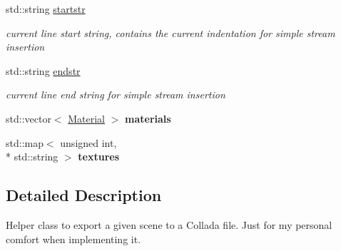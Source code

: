 \begin{DoxyCompactItemize}
\item 
\hypertarget{class_assimp_1_1_collada_exporter_aa000555b4aab13b953e4a07e65f98c30}{std\+::string \hyperlink{class_assimp_1_1_collada_exporter_aa000555b4aab13b953e4a07e65f98c30}{startstr}}\label{class_assimp_1_1_collada_exporter_aa000555b4aab13b953e4a07e65f98c30}

\begin{DoxyCompactList}\small\item\em current line start string, contains the current indentation for simple stream insertion \end{DoxyCompactList}\item 
\hypertarget{class_assimp_1_1_collada_exporter_a744b568aab4fbde6c09e85582e6105ea}{std\+::string \hyperlink{class_assimp_1_1_collada_exporter_a744b568aab4fbde6c09e85582e6105ea}{endstr}}\label{class_assimp_1_1_collada_exporter_a744b568aab4fbde6c09e85582e6105ea}

\begin{DoxyCompactList}\small\item\em current line end string for simple stream insertion \end{DoxyCompactList}\item 
\hypertarget{class_assimp_1_1_collada_exporter_abcc28c3cb4ce8c39ccc762f171d854ae}{std\+::vector$<$ \hyperlink{struct_assimp_1_1_collada_exporter_1_1_material}{Material} $>$ {\bfseries materials}}\label{class_assimp_1_1_collada_exporter_abcc28c3cb4ce8c39ccc762f171d854ae}

\item 
\hypertarget{class_assimp_1_1_collada_exporter_a7a7ca0261c7f367c7d473e2e55306678}{std\+::map$<$ unsigned int, \\*
std\+::string $>$ {\bfseries textures}}\label{class_assimp_1_1_collada_exporter_a7a7ca0261c7f367c7d473e2e55306678}

\end{DoxyCompactItemize}


\subsection{Detailed Description}
Helper class to export a given scene to a Collada file. Just for my personal comfort when implementing it. 


